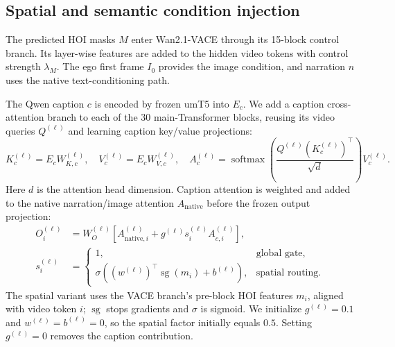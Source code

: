 \documentclass{article} %
\begin{document}
\subsection{Spatial and semantic condition injection}
\label{sec:condition-injection}
\label{sec:stage1-method}
\label{sec:stage2-method}
\label{sec:spatial-route}

The predicted HOI masks $M$ enter Wan2.1-VACE through its 15-block control
branch. Its layer-wise features are added to the hidden video tokens with
control strength $\lambda_M$. The ego first frame $I_0$ provides the image
condition, and narration $n$ uses the native text-conditioning path.

The Qwen caption $c$ is encoded by frozen umT5 into $E_c$. We add a caption
cross-attention branch to each of the 30 main-Transformer blocks, reusing its
video queries $Q^{(\ell)}$ and learning caption key/value projections:
\begin{equation}
K_c^{(\ell)}=E_cW_{K,c}^{(\ell)},\quad
V_c^{(\ell)}=E_cW_{V,c}^{(\ell)},\quad
A_c^{(\ell)}=\operatorname{softmax}\!\left(
\frac{Q^{(\ell)}(K_c^{(\ell)})^\top}{\sqrt d}\right)V_c^{(\ell)}.
\label{eq:caption-attention}
\end{equation}
Here $d$ is the attention head dimension. Caption attention is weighted and
added to the native narration/image attention $A_{\mathrm{native}}$ before
the frozen output projection:
\begin{equation}
\begin{aligned}
O_i^{(\ell)} &= W_O^{(\ell)}\!\left[
A_{\mathrm{native},i}^{(\ell)}+g^{(\ell)}s_i^{(\ell)}A_{c,i}^{(\ell)}\right],\\
s_i^{(\ell)}&=
\begin{cases}
1, & \text{global gate},\\
\sigma\!\left((w^{(\ell)})^\top\operatorname{sg}(m_i)+b^{(\ell)}\right),
& \text{spatial routing}.
\end{cases}
\end{aligned}
\label{eq:caption-injection}
\end{equation}
The spatial variant uses the VACE branch's pre-block HOI features $m_i$,
aligned with video token $i$; $\operatorname{sg}$ stops gradients and
$\sigma$ is sigmoid. We initialize $g^{(\ell)}=0.1$ and $w^{(\ell)}=b^{(\ell)}=0$,
so the spatial factor initially equals $0.5$. Setting $g^{(\ell)}=0$ removes
the caption contribution.
\end{document}

